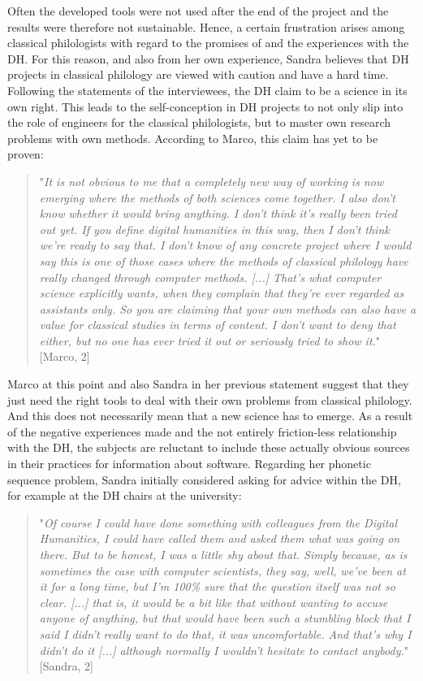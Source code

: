\documentclass[12pt, a4paper, titlepage, oneside, abstract=true, toc=listof, toc=bibliography]{scrreprt}
\begin{document}
{Often the developed tools were not used after the end of the project and the results were therefore not sustainable. Hence, a certain frustration arises among classical philologists with regard to the promises of and the experiences with the DH. For this reason, and also from her own experience, Sandra believes that DH projects in classical philology are viewed with caution and have a hard time. Following the statements of the interviewees, the DH claim to be a science in its own right. This leads to the self-conception in DH projects to not only slip into the role of engineers for the classical philologists, but to master own research problems with own methods. According to Marco, this claim has yet to be proven: 

\begin{quotation}
"\textit{It is not obvious to me that a completely new way of working is now emerging where the methods of both sciences come together. I also don't know whether it would bring anything. I don't think it's really been tried out yet. If you define digital humanities in this way, then I don't think we're ready to say that. I don't know of any concrete project where I would say this is one of those cases where the methods of classical philology have really changed through computer methods. [...] That's what computer science explicitly wants, when they complain that they're ever regarded as assistants only. So you are claiming that your own methods can also have a value for classical studies in terms of content. I don't want to deny that either, but no one has ever tried it out or seriously tried to show it.}" [Marco, 2]
\end{quotation}

Marco at this point and also Sandra in her previous statement suggest that they just need the right tools to deal with their own problems from classical philology. And this does not necessarily mean that a new science has to emerge. As a result of the negative experiences made and the not entirely friction-less relationship with the DH, the subjects are reluctant to include these actually obvious sources in their practices for information about software. Regarding her phonetic sequence problem, Sandra initially considered asking for advice within the DH, for example at the DH chairs at the university:

\begin{quotation}
"\textit{Of course I could have done something with colleagues from the Digital Humanities, I could have called them and asked them what was going on there. But to be honest, I was a little shy about that. Simply because, as is sometimes the case with computer scientists, they say, well, we've been at it for a long time, but I'm 100\% sure that the question itself was not so clear. [...] that is, it would be a bit like that without wanting to accuse anyone of anything, but that would have been such a stumbling block that I said I didn't really want to do that, it was uncomfortable. And that's why I didn't do it [...] although normally I wouldn't hesitate to contact anybody.}" [Sandra, 2]
\end{quotation}

}
\end{document}
